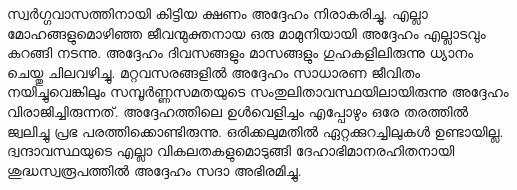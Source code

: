 സ്വര്‍ഗ്ഗവാസത്തിനായി കിട്ടിയ ക്ഷണം അദ്ദേഹം നിരാകരിച്ചു. എല്ലാ മോഹങ്ങളുമൊഴിഞ്ഞ ജീവന്മുക്തനായ ഒരു മാമുനിയായി അദ്ദേഹം എല്ലാടവും കറങ്ങി നടന്നു. അദ്ദേഹം ദിവസങ്ങളും മാസങ്ങളും ഗുഹകളിലിരുന്നു ധ്യാനം ചെയ്തു ചിലവഴിച്ചു. മറ്റവസരങ്ങളില്‍ അദ്ദേഹം സാധാരണ ജീവിതം നയിച്ചുവെങ്കിലും സമ്പൂര്‍ണ്ണസമതയുടെ സംതുലിതാവസ്ഥയിലായിരുന്നു അദ്ദേഹം വിരാജിച്ചിരുന്നത്. അദ്ദേഹത്തിലെ ഉള്‍വെളിച്ചം എപ്പോഴും ഒരേ തരത്തില്‍ ജ്വലിച്ചു പ്രഭ പരത്തിക്കൊണ്ടിരുന്നു. ഒരിക്കലുമതില്‍ ഏറ്റക്കുറച്ചിലുകള്‍ ഉണ്ടായില്ല. ദ്വന്ദാവസ്ഥയുടെ എല്ലാ വികലതകളുമൊടുങ്ങി ദേഹാഭിമാനരഹിതനായി ശുദ്ധസ്വരൂപത്തില്‍ അദ്ദേഹം സദാ അഭിരമിച്ചു.
